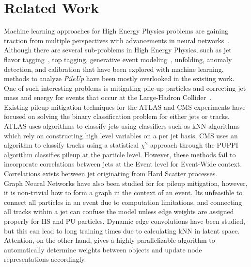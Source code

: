 \section{Related Work}\hfill

Machine learning approaches for High Energy Physics problems are gaining traction from multiple perspectives with advancements in neural networks~\cite{he2023high,Barman_2024,Larkoski_2020}. Although there are several sub-problems in High Energy Physics, such as jet flavor tagging~\cite{qu2022particle`}, top tagging, generative event modeling~\cite{kansal2021particle}, unfolding, anomaly detection, and calibration that have been explored with machine learning, methods to analyze \emph{PileUp} have been mostly overlooked in the existing work. One of such interesting problems is mitigating pile-up particles and correcting jet mass and energy for events that occur at the Large-Hadron Collider~\cite{komiske2017pileup}. \\ 

Existing pileup mitigation techniques for the ATLAS and CMS experiments have focused on solving the binary classification problem for either jets or tracks. ATLAS uses algorithms to classify jets using classifiers such as kNN algorithms~\cite{ATLAS-CONF-2014-018} which rely on constructing high level variables on a per jet basis. CMS uses an algorithm to classify tracks using a statistical $\chi^2$ approach through the PUPPI~\cite{Bertolini_2014} algorithm classifies pileup at the particle level. However, these methods fail to incorporate correlations between jets at the Event level for Event-Wide context. Correlations exists between jet originating from Hard Scatter processes.  \\

Graph Neural Networks have also been studied for for pileup mitigation, however, it is non-trivial how to form a graph in the context of an event. Its unfeasible to connect all particles in an event due to computation limitations, and connecting all tracks within a jet can confuse the model unless edge weights are assigned properly for HS and PU particles. Dynamic edge convolutions have been studied, but this can lead to long training times due to calculating kNN in latent space. Attention, on the other hand, gives a highly parallelizable algorithm to automatically determine weights between objects and update node representations accordingly.
